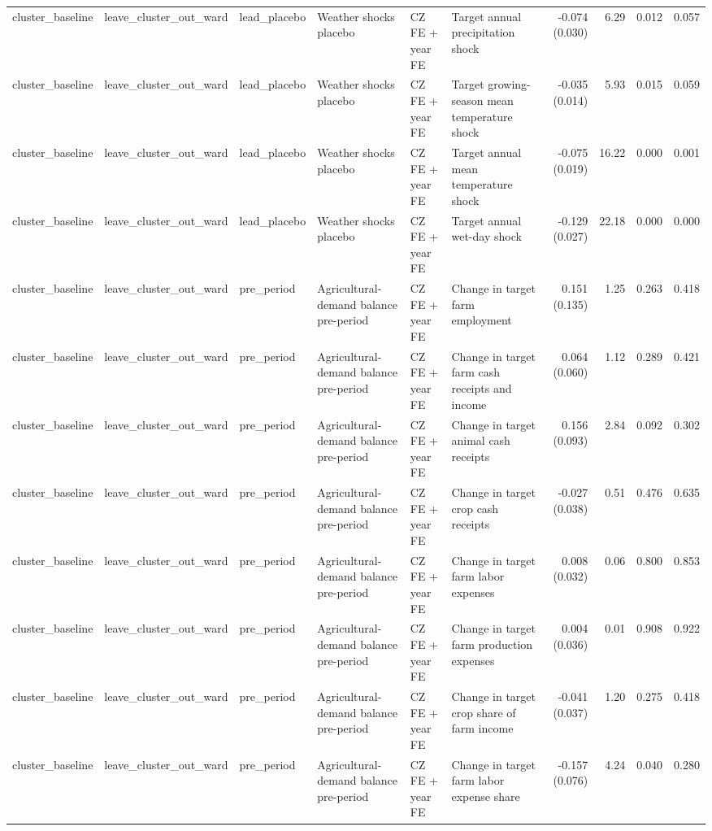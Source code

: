 \begin{tabular}{llllllrrrr}
cluster_baseline & leave_cluster_out_ward & lead_placebo & Weather shocks placebo & CZ FE + year FE & Target annual precipitation shock & -0.074 (0.030) & 6.29 & 0.012 & 0.057 \\
cluster_baseline & leave_cluster_out_ward & lead_placebo & Weather shocks placebo & CZ FE + year FE & Target growing-season mean temperature shock & -0.035 (0.014) & 5.93 & 0.015 & 0.059 \\
cluster_baseline & leave_cluster_out_ward & lead_placebo & Weather shocks placebo & CZ FE + year FE & Target annual mean temperature shock & -0.075 (0.019) & 16.22 & 0.000 & 0.001 \\
cluster_baseline & leave_cluster_out_ward & lead_placebo & Weather shocks placebo & CZ FE + year FE & Target annual wet-day shock & -0.129 (0.027) & 22.18 & 0.000 & 0.000 \\
cluster_baseline & leave_cluster_out_ward & pre_period & Agricultural-demand balance pre-period & CZ FE + year FE & Change in target farm employment & 0.151 (0.135) & 1.25 & 0.263 & 0.418 \\
cluster_baseline & leave_cluster_out_ward & pre_period & Agricultural-demand balance pre-period & CZ FE + year FE & Change in target farm cash receipts and income & 0.064 (0.060) & 1.12 & 0.289 & 0.421 \\
cluster_baseline & leave_cluster_out_ward & pre_period & Agricultural-demand balance pre-period & CZ FE + year FE & Change in target animal cash receipts & 0.156 (0.093) & 2.84 & 0.092 & 0.302 \\
cluster_baseline & leave_cluster_out_ward & pre_period & Agricultural-demand balance pre-period & CZ FE + year FE & Change in target crop cash receipts & -0.027 (0.038) & 0.51 & 0.476 & 0.635 \\
cluster_baseline & leave_cluster_out_ward & pre_period & Agricultural-demand balance pre-period & CZ FE + year FE & Change in target farm labor expenses & 0.008 (0.032) & 0.06 & 0.800 & 0.853 \\
cluster_baseline & leave_cluster_out_ward & pre_period & Agricultural-demand balance pre-period & CZ FE + year FE & Change in target farm production expenses & 0.004 (0.036) & 0.01 & 0.908 & 0.922 \\
cluster_baseline & leave_cluster_out_ward & pre_period & Agricultural-demand balance pre-period & CZ FE + year FE & Change in target crop share of farm income & -0.041 (0.037) & 1.20 & 0.275 & 0.418 \\
cluster_baseline & leave_cluster_out_ward & pre_period & Agricultural-demand balance pre-period & CZ FE + year FE & Change in target farm labor expense share & -0.157 (0.076) & 4.24 & 0.040 & 0.280 \\

\end{tabular}

